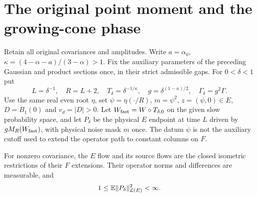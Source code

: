 \section{The original point moment and the growing-cone phase}
\label{S:original-point-transfer}

Retain all original covariances and amplitudes. Write $a = \alpha_0$, $\kappa =
(4-\alpha-a)/(3-\alpha) > 1$. Fix the auxiliary parameters of the preceding
Gaussian and product sections once, in their strict admissible gaps. For $0 <
\delta < 1$ put
\[
  L=\delta^{-1},\quad R=L+2,\quad T_\delta=\delta^{-1/\kappa},
  \quad g=\delta^{(1-a)/2},\quad \Gamma_\delta=g^2\Gamma .
\]
Use the same real even root $\eta$, set $\psi = \eta(\cdot/R)$, $m = \psi^2$, $z
= (\psi,0) \in E$, $D = B_1(0)$ and $v_d = |D| > 0$. Let $W_{\rm fast} = W\circ
T_{\delta,0}$ on the given slow probability space, and let $P_\delta$ be the
physical $E$ endpoint at time $L$ driven by $gM_R(W_{\rm fast})$, with physical
noise mask $m$ once. The datum $\psi$ is not the auxiliary cutoff used to extend
the operator path to constant columns on $F$.

\begin{lemma}
  \label{L:point-actual-finiteness}
  For nonzero covariance, the $E$ flow and its source flows are the closed
  isometric restrictions of their $F$ extensions. Their operator norms and
  differences are measurable, and
  \begin{equation}\label{E:point-fixed-finiteness}
    1\le\mathbb{E}\|P_\delta\|_{\mathcal{L}(E)}^2<\infty .
  \end{equation}
\end{lemma}

